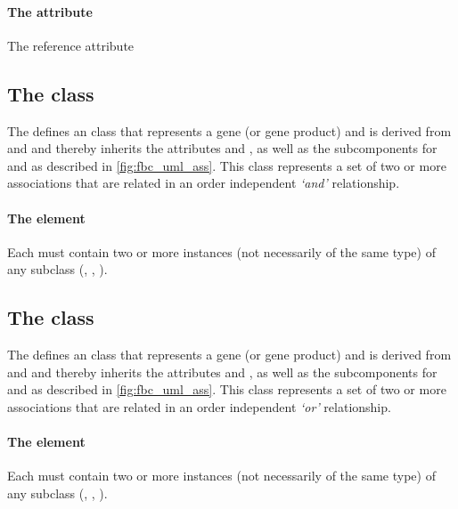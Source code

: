 \paragraph{The  attribute}
The reference attribute



\subsection{The \FBC {} class}
\label{and-class}

The \FBCPackage defines an \GeneAnd class that represents a gene (or gene product) and is derived from and \Association and thereby inherits the \SBase attributes  and , as well as the subcomponents for \Annotation and \Notes as described in \ref{fig:fbc_uml_ass}. This class represents a set of two or more associations that are related in an order independent \emph{`and'} relationship.

\paragraph{The  element}
Each \GeneAnd must contain two or more instances (not necessarily of the same type) of any \Association subclass (\GeneAnd, \GeneOr, \Gene).


\subsection{The \FBC {} class}
\label{or-class}

The \FBCPackage defines an \GeneOr class that represents a gene (or gene product) and is derived from and \Association and thereby inherits the \SBase attributes  and , as well as the subcomponents for \Annotation and \Notes as described in \ref{fig:fbc_uml_ass}. This class represents a set of two or more associations that are related in an order independent \emph{`or'} relationship.

\paragraph{The  element}
Each \GeneOr must contain two or more instances (not necessarily of the same type) of any \Association subclass (\GeneAnd, \GeneOr, \Gene).

